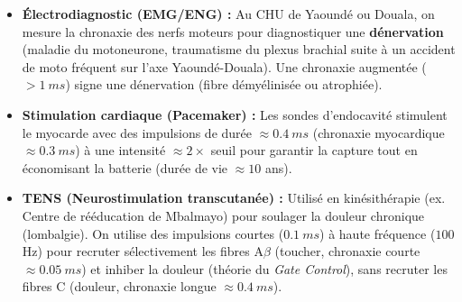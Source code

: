 \documentclass[11pt]{article}
\begin{document}
\begin{savaistu}
\begin{itemize}
    \item \textbf{Électrodiagnostic (EMG/ENG) :} Au CHU de Yaoundé ou Douala, on mesure la chronaxie des nerfs moteurs pour diagnostiquer une \textbf{dénervation} (maladie du motoneurone, traumatisme du plexus brachial suite à un accident de moto fréquent sur l'axe Yaoundé-Douala). Une chronaxie augmentée ($> \SI{1}{ms}$) signe une dénervation (fibre démyélinisée ou atrophiée).
    \item \textbf{Stimulation cardiaque (Pacemaker) :} Les sondes d'endocavité stimulent le myocarde avec des impulsions de durée $\approx \SI{0,4}{ms}$ (chronaxie myocardique $\approx \SI{0,3}{ms}$) à une intensité $\approx 2 \times$ seuil pour garantir la capture tout en économisant la batterie (durée de vie $\approx 10$ ans).
    \item \textbf{TENS (Neurostimulation transcutanée) :} Utilisé en kinésithérapie (ex. Centre de rééducation de Mbalmayo) pour soulager la douleur chronique (lombalgie). On utilise des impulsions courtes ($\SI{0,1}{ms}$) à haute fréquence ($100$ Hz) pour recruter sélectivement les fibres A$\beta$ (toucher, chronaxie courte $\approx \SI{0,05}{ms}$) et inhiber la douleur (théorie du \emph{Gate Control}), sans recruter les fibres C (douleur, chronaxie longue $\approx \SI{0,4}{ms}$).
\end{itemize}
\end{savaistu}
\end{document}
